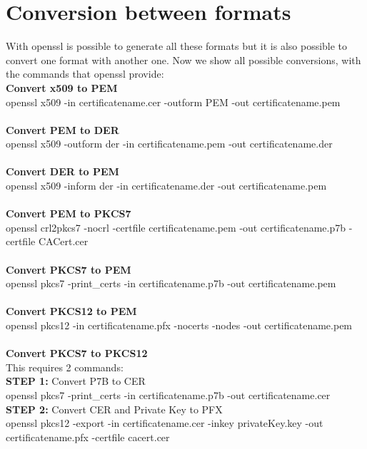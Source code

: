 \documentclass{article}
\begin{document}
\section{Conversion between formats}
With openssl is possible to generate all these formats but it is also possible to convert one format with another one. Now we show all possible conversions, with the commands that openssl provide:\\
\textbf{Convert x509 to PEM}\\
openssl x509 -in certificatename.cer -outform PEM -out certificatename.pem\\\\
\textbf{Convert PEM to DER}\\
openssl x509 -outform der -in certificatename.pem -out certificatename.der\\\\
\textbf{Convert DER to PEM}\\
openssl x509 -inform der -in certificatename.der -out certificatename.pem\\\\
\textbf{Convert PEM to PKCS7}\\
openssl crl2pkcs7 -nocrl -certfile certificatename.pem -out certificatename.p7b -certfile CACert.cer\\\\
\textbf{Convert PKCS7 to PEM}\\
openssl pkcs7 -print\_certs -in certificatename.p7b -out certificatename.pem\\\\
\textbf{Convert PKCS12 to PEM}\\
openssl pkcs12 -in certificatename.pfx -nocerts -nodes -out certificatename.pem\\\\
\textbf{Convert PKCS7 to PKCS12}\\
This requires 2 commands:\\
\textbf{STEP 1:} Convert P7B to CER\\
openssl pkcs7 -print\_certs -in certificatename.p7b -out certificatename.cer\\
\textbf{STEP 2:} Convert CER and Private Key to PFX\\
openssl pkcs12 -export -in certificatename.cer -inkey privateKey.key -out certificatename.pfx -certfile  cacert.cer\\
\end{document}
